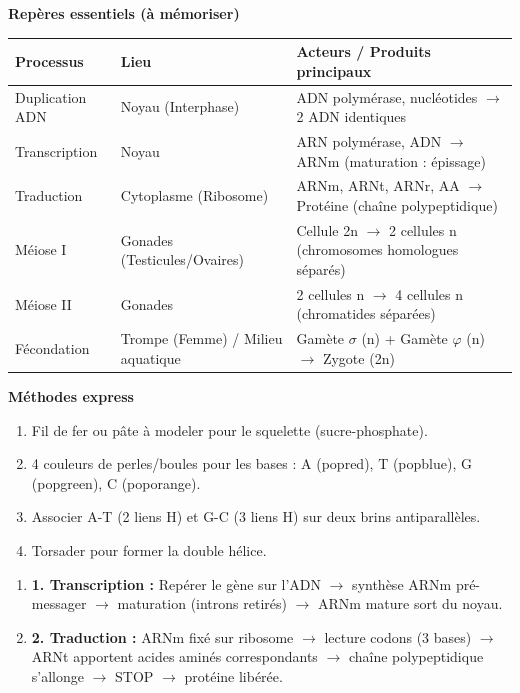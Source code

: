\documentclass[11pt]{article}
\begin{document}
\begin{bilan}
\textbf{Repères essentiels (à mémoriser)}
\begin{center}
\begin{tabularx}{\linewidth}{|l|X|X|}\hline
\rowcolor{popblueL}
\textbf{Processus} & \textbf{Lieu} & \textbf{Acteurs / Produits principaux} \\ \hline
Duplication ADN & Noyau (Interphase) & ADN polymérase, nucléotides $\to$ 2 ADN identiques \\ \hline
Transcription & Noyau & ARN polymérase, ADN $\to$ ARNm (maturation : épissage) \\ \hline
Traduction & Cytoplasme (Ribosome) & ARNm, ARNt, ARNr, AA $\to$ Protéine (chaîne polypeptidique) \\ \hline
Méiose I & Gonades (Testicules/Ovaires) & Cellule 2n $\to$ 2 cellules n (chromosomes homologues séparés) \\ \hline
Méiose II & Gonades & 2 cellules n $\to$ 4 cellules n (chromatides séparées) \\ \hline
Fécondation & Trompe (Femme) / Milieu aquatique & Gamète $\sigma$ (n) + Gamète $\varphi$ (n) $\to$ Zygote (2n) \\ \hline
\end{tabularx}
\end{center}

\textbf{Méthodes express}
\begin{methode}
\begin{enumerate}
  \item Fil de fer ou pâte à modeler pour le squelette (sucre-phosphate).
  \item 4 couleurs de perles/boules pour les bases : A (popred), T (popblue), G (popgreen), C (poporange).
  \item Associer A-T (2 liens H) et G-C (3 liens H) sur deux brins antiparallèles.
  \item Torsader pour former la double hélice.
\end{enumerate}
\end{methode}

\begin{methode}
\begin{enumerate}
  \item \textbf{1. Transcription :} Repérer le gène sur l'ADN $\to$ synthèse ARNm pré-messager $\to$ maturation (introns retirés) $\to$ ARNm mature sort du noyau.
  \item \textbf{2. Traduction :} ARNm fixé sur ribosome $\to$ lecture codons (3 bases) $\to$ ARNt apportent acides aminés correspondants $\to$ chaîne polypeptidique s'allonge $\to$ STOP $\to$ protéine libérée.
\end{enumerate}
\end{methode}


\end{bilan}
\end{document}
